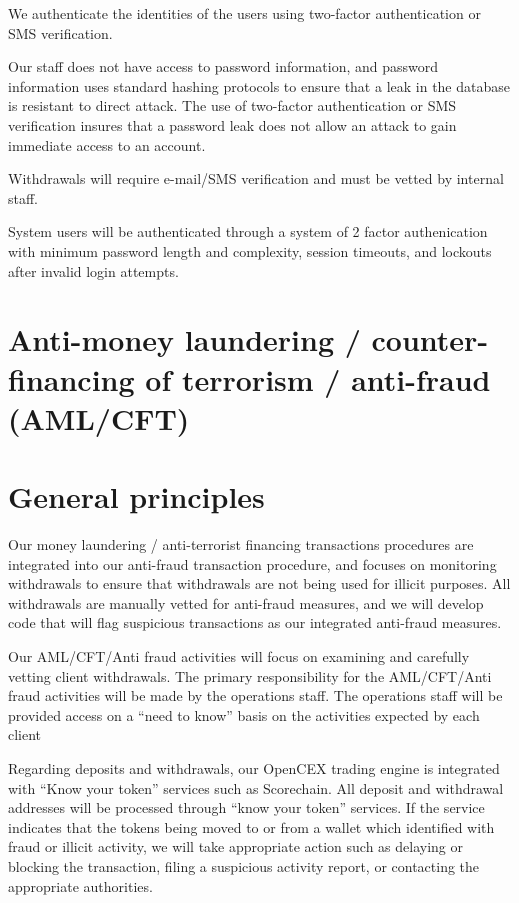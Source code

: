 We authenticate the identities of the users using two-factor
authentication or SMS verification.

Our staff does not have access to password information, and password
information uses standard hashing protocols to ensure that a leak in
the database is resistant to direct attack.  The use of two-factor
authentication or SMS verification insures that a password leak does
not allow an attack to gain immediate access to an account.

Withdrawals will require e-mail/SMS verification and must be vetted by
internal staff.

System users will be authenticated through a system of 2 factor
authenication with minimum password length and complexity, session
timeouts, and lockouts after invalid login attempts.

\section{Anti-money laundering / counter-financing of terrorism /
  anti-fraud (AML/CFT)}

\section{General principles}

Our money laundering / anti-terrorist financing transactions
procedures are integrated into our anti-fraud transaction procedure,
and focuses on monitoring withdrawals to ensure that withdrawals are
not being used for illicit purposes.  All withdrawals are manually
vetted for anti-fraud measures, and we will develop code that will
flag suspicious transactions as our integrated anti-fraud measures.

Our AML/CFT/Anti fraud activities will focus on examining and
carefully vetting client withdrawals.  The primary responsibility for
the AML/CFT/Anti fraud activities will be made by the operations
staff.  The operations staff will be provided access on a ``need to
know'' basis on the activities expected by each client

Regarding deposits and withdrawals, our OpenCEX trading engine
is integrated with ``Know your token'' services such as Scorechain.
All deposit and withdrawal addresses will be processed through ``know
your token'' services.  If the service indicates that
the tokens being moved to or from a wallet which identified with fraud
or illicit activity, we will take appropriate action such as
delaying or blocking the transaction, filing a suspicious activity
report, or contacting the appropriate authorities.

